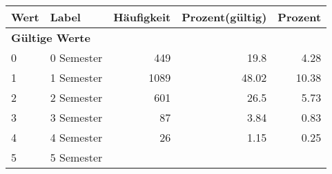      \begin{longtable}{lXrrr}
     \toprule
     \textbf{Wert} & \textbf{Label} & \textbf{Häufigkeit} & \textbf{Prozent(gültig)} & \textbf{Prozent} \\
     \endhead
     \midrule
     \multicolumn{5}{l}{\textbf{Gültige Werte}}\\

     0 &
     \multicolumn{1}{X}{ 0 Semester   } &


       \num{449} &
       \num[round-mode=places,round-precision=2]{19,8} &
         \num[round-mode=places,round-precision=2]{4,28} \\

     1 &
     \multicolumn{1}{X}{ 1 Semester   } &


       \num{1089} &
       \num[round-mode=places,round-precision=2]{48,02} &
         \num[round-mode=places,round-precision=2]{10,38} \\

     2 &
     \multicolumn{1}{X}{ 2 Semester   } &


       \num{601} &
       \num[round-mode=places,round-precision=2]{26,5} &
         \num[round-mode=places,round-precision=2]{5,73} \\

     3 &
     \multicolumn{1}{X}{ 3 Semester   } &


       \num{87} &
       \num[round-mode=places,round-precision=2]{3,84} &
         \num[round-mode=places,round-precision=2]{0,83} \\

     4 &
     \multicolumn{1}{X}{ 4 Semester   } &


       \num{26} &
       \num[round-mode=places,round-precision=2]{1,15} &
         \num[round-mode=places,round-precision=2]{0,25} \\

     5 &
     \multicolumn{1}{X}{ 5 Semester   } &



\end{longtable}
